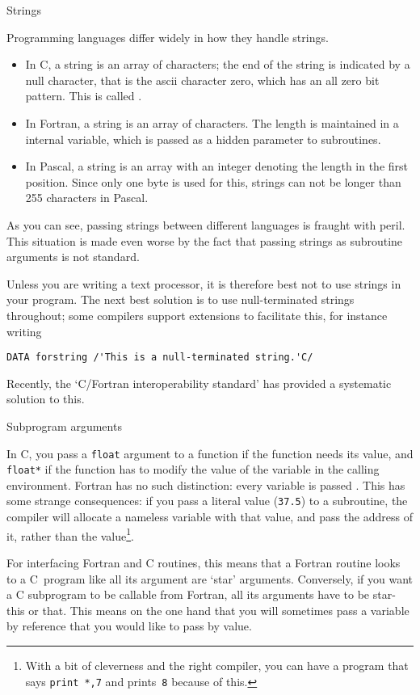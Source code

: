  {Strings}

Programming languages differ widely in how they handle strings. 
\begin{itemize}
\item In C, a string is an array of characters; the end of the string
  is indicated by a null character, that is the ascii character zero,
  which has an all zero bit pattern. This is called .
\item In Fortran, a string is an array of characters. The length is
  maintained in a internal variable, which is passed as a hidden
  parameter to subroutines.
\item In Pascal, a string is an array with an integer denoting the
  length in the first position. Since only one byte is used for this,
  strings can not be longer than 255 characters in Pascal.
\end{itemize}
As you can see, passing strings between different languages is fraught
with peril. This situation is made even worse by the fact that passing
strings as subroutine arguments is not standard.

Unless you are writing a text processor, it is therefore best not to
use strings in your program. The next best solution is to use
null-terminated strings throughout; some compilers support extensions
to facilitate this, for instance writing
\begin{verbatim}
DATA forstring /'This is a null-terminated string.'C/
\end{verbatim}

Recently, the `C/Fortran interoperability standard' has
provided a systematic solution to this.

 {Subprogram arguments}

In C, you pass a \texttt{float} argument to a function if the function
needs its value, and \texttt{float*} if the function has to modify the
value of the variable in the calling environment. Fortran has no such
distinction: every variable is passed . This
has some strange consequences: if you pass a literal value
(\texttt{37.5}) to a subroutine, the compiler will allocate a nameless
variable with that value, and pass the address of it, rather than the
value\footnote{With a bit of cleverness and the right compiler, you
  can have a program that says \texttt{print *,7} and
  prints~\texttt{8} because of this.}.

For interfacing Fortran and C routines, this means that a Fortran
routine looks to a C~program like all its argument are `star'
arguments. Conversely, if you want a C subprogram to be callable from
Fortran, all its arguments have to be star-this or that. This means on
the one hand that you will sometimes pass a variable by reference that
you would like to pass by value.

